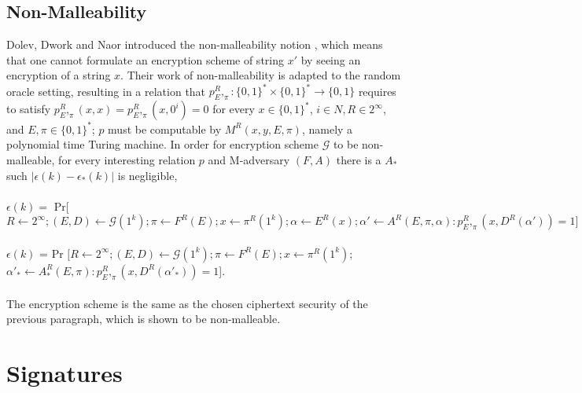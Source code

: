 \documentclass{article}
\begin{document}
\subsection{Non-Malleability}

Dolev, Dwork and Naor introduced the non-malleability notion \cite{10.1145/103418.103474}, which means that one cannot formulate an encryption scheme of string $x\prime$ by seeing an encryption of a string $x$. Their work of non-malleability is adapted to the random oracle setting, resulting in a relation that $p^R_E,_\pi: \lbrace0,1\rbrace^* \times \lbrace0,1\rbrace^* \to \lbrace0,1\rbrace$ requires to satisfy $p^R_E,_\pi(x,x)=p^R_E,_\pi(x,0^i)=0$ for every $x\in \lbrace0,1\rbrace^*$, $i\in N,R\in 2^\infty$, and $E,\pi \in \lbrace0,1\rbrace^*$; $p$ must be computable by $M^R(x,y,E, \pi)$, namely a polynomial time Turing machine. In order for encryption scheme $\mathcal{G}$ to be non-malleable, for every interesting relation $p$ and M-adversary $(F,A)$ there is a $A_*$ such $|\epsilon(k)-\epsilon_*(k)|$ is negligible, 
\\\\
\noindent
$\epsilon(k)=$ Pr[$R\gets2^\infty;(E,D)\gets \mathcal{G}(1^k);\pi \gets F^R(E); x\gets \pi^R(1^k); \alpha \gets E^R(x); \alpha\prime \gets A^R(E, \pi, \alpha): p^R_E,_\pi(x,D^R(\alpha\prime))=1]$ 
\\\\
\noindent
$\epsilon(k)$ = Pr $[R\gets2^\infty;(E,D)\gets \mathcal{G}(1^k);\pi \gets F^R(E); x\gets \pi^R(1^k)$; $\alpha\prime_* \gets A_*^R(E, \pi):p^R_E,_\pi(x,D^R(\alpha\prime_*))=1$]. 
\\\\
The encryption scheme is the same as the chosen ciphertext security of the previous paragraph, which is shown to be non-malleable.

\section{Signatures}
\end{document}
